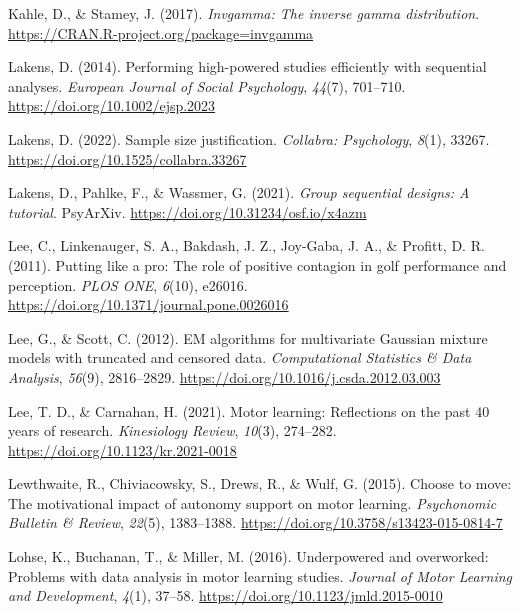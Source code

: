 \documentclass[
  man, donotrepeattitle,mask,floatsintext]{apa7}
\newlength{\cslhangindent}
\newlength{\cslentryspacingunit} %
\newenvironment{CSLReferences}[2] %
 {%
  \setlength{\parindent}{0pt}
  \ifodd #1
  \let\oldpar\par
  \def\par{\hangindent=\cslhangindent\oldpar}
  \fi
  \setlength{\parskip}{#2\cslentryspacingunit}
 }%
 {}
\begin{document}
\begin{CSLReferences}{1}{0}
\leavevmode{}%
Kahle, D., \& Stamey, J. (2017). \emph{Invgamma: The inverse gamma distribution}. \url{https://CRAN.R-project.org/package=invgamma}

\leavevmode{}%
Lakens, D. (2014). Performing high-powered studies efficiently with sequential analyses. \emph{European Journal of Social Psychology}, \emph{44}(7), 701--710. \url{https://doi.org/10.1002/ejsp.2023}

\leavevmode{}%
Lakens, D. (2022). Sample size justification. \emph{Collabra: Psychology}, \emph{8}(1), 33267. \url{https://doi.org/10.1525/collabra.33267}

\leavevmode{}%
Lakens, D., Pahlke, F., \& Wassmer, G. (2021). \emph{Group sequential designs: A tutorial}. {PsyArXiv}. \url{https://doi.org/10.31234/osf.io/x4azm}

\leavevmode{}%
Lee, C., Linkenauger, S. A., Bakdash, J. Z., Joy-Gaba, J. A., \& Profitt, D. R. (2011). Putting like a pro: The role of positive contagion in golf performance and perception. \emph{PLOS ONE}, \emph{6}(10), e26016. \url{https://doi.org/10.1371/journal.pone.0026016}

\leavevmode{}%
Lee, G., \& Scott, C. (2012). {EM} algorithms for multivariate {Gaussian} mixture models with truncated and censored data. \emph{Computational Statistics \& Data Analysis}, \emph{56}(9), 2816--2829. \url{https://doi.org/10.1016/j.csda.2012.03.003}

\leavevmode{}%
Lee, T. D., \& Carnahan, H. (2021). Motor learning: Reflections on the past 40 years of research. \emph{Kinesiology Review}, \emph{10}(3), 274--282. \url{https://doi.org/10.1123/kr.2021-0018}

\leavevmode{}%
Lewthwaite, R., Chiviacowsky, S., Drews, R., \& Wulf, G. (2015). Choose to move: The motivational impact of autonomy support on motor learning. \emph{Psychonomic Bulletin \& Review}, \emph{22}(5), 1383--1388. \url{https://doi.org/10.3758/s13423-015-0814-7}

\leavevmode{}%
Lohse, K., Buchanan, T., \& Miller, M. (2016). Underpowered and overworked: Problems with data analysis in motor learning studies. \emph{Journal of Motor Learning and Development}, \emph{4}(1), 37--58. \url{https://doi.org/10.1123/jmld.2015-0010}


\end{CSLReferences}
\end{document}
